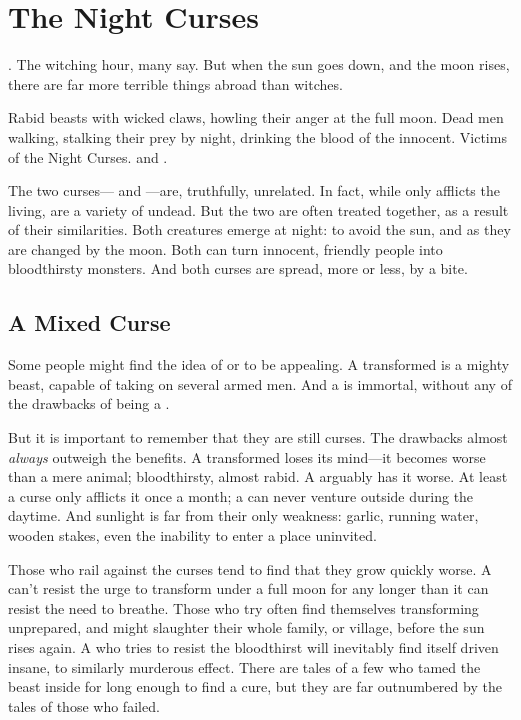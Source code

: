 \chapter{The Night Curses}

.
The witching hour, many say.
But when the sun goes down, and the moon rises, there are far more terrible things abroad than witches.

Rabid beasts with wicked claws, howling their anger at the full moon.
Dead men walking, stalking their prey by night, drinking the blood of the innocent.
Victims of the Night Curses.
{\werewolves} and {\vampires}.

The two curses---{\lycanthropy} and {\vampirism}---are, truthfully, unrelated.
In fact, while {\lycanthropy} only afflicts the living, {\vampires} are a variety of undead.
But the two are often treated together, as a result of their similarities.
Both creatures emerge at night: {\vampires} to avoid the sun, and {\werewolves} as they are changed by the moon.
Both can turn innocent, friendly people into bloodthirsty monsters.
And both curses are spread, more or less, by a bite.

\section{A Mixed Curse}

Some people might find the idea of {\lycanthropy} or {\vampirism} to be appealing.
A transformed {\werewolf} is a mighty beast, capable of taking on several armed men.
And a {\vampire} is immortal, without any of the drawbacks of being a .

But it is important to remember that they are still curses.
The drawbacks almost \emph{always} outweigh the benefits.
A transformed {\werewolf} loses its mind---it becomes worse than a mere animal; bloodthirsty, almost rabid.
A {\vampire} arguably has it worse.
At least a {\werewolfpossessive} curse only afflicts it once a month; a {\vampire} can never venture outside during the daytime.
And sunlight is far from their only weakness: garlic, running water, wooden stakes, even the inability to enter a place uninvited.

Those who rail against the curses tend to find that they grow quickly worse.
A {\werewolf} can't resist the urge to transform under a full moon for any longer than it can resist the need to breathe.
Those who try often find themselves transforming unprepared, and might slaughter their whole family, or village, before the sun rises again.
A {\vampire} who tries to resist the bloodthirst will inevitably find itself driven insane, to similarly murderous effect.
There are tales of a few who tamed the beast inside for long enough to find a cure, but they are far outnumbered by the tales of those who failed.

